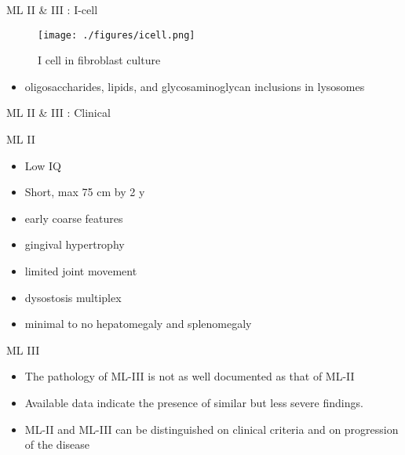 \documentclass[presentation, smaller]{beamer}
\begin{document}
\begin{frame}[label={sec:orgheadline7}]{ML II \& III : I-cell}
\begin{figure}[htb]
\centering
\texttt{[image: ./figures/icell.png]}
\caption{\label{fig:icell}
I cell in fibroblast culture}
\end{figure}

\begin{itemize}
\item oligosaccharides, lipids, and glycosaminoglycan inclusions in lysosomes
\end{itemize}
\end{frame}

\begin{frame}[label={sec:orgheadline8}]{ML II \& III : Clinical}
\begin{block}{ML II}
\begin{itemize}
\item Low IQ
\item Short, max 75 cm by 2 y
\item early coarse features
\item gingival hypertrophy
\item limited joint movement
\item dysostosis multiplex
\item minimal to no hepatomegaly and splenomegaly
\end{itemize}
\end{block}

\begin{block}{ML III}
\begin{itemize}
\item The pathology of ML-III is not as well documented as that of ML-II
\item Available data indicate the presence of similar but less severe
findings.

\item ML-II and ML-III can be distinguished on clinical criteria and on progression of the disease
\end{itemize}
\end{block}
\end{frame}
\end{document}
